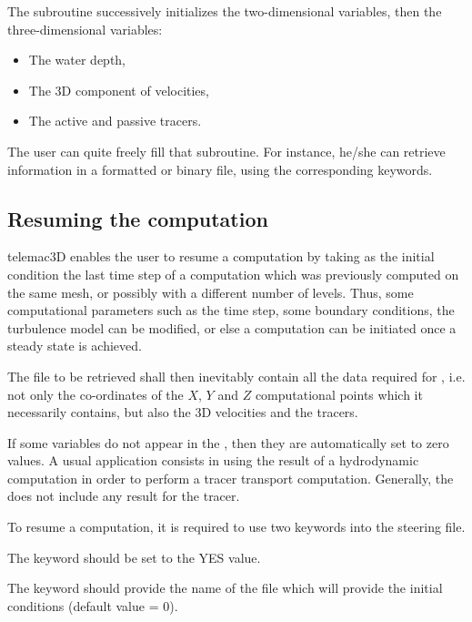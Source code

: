 The  subroutine successively initializes the two-dimensional
variables, then the three-dimensional variables:

\begin{itemize}
\item The water depth,

\item The 3D component of velocities,

\item The active and passive tracers.
\end{itemize}

The user can quite freely fill that subroutine. For instance, he/she can
retrieve information in a formatted or binary file, using the corresponding
keywords.


\subsection{Resuming the computation}

telemac{3D} enables the user to resume a computation by taking as the initial
condition the last time step of a computation which was previously computed on
the same mesh, or possibly with a different number of levels. Thus, some
computational parameters such as the time step, some boundary conditions, the
turbulence model can be modified, or else a computation can be initiated once a
steady state is achieved.

The file to be retrieved shall then inevitably contain all the data required
for , i.e. not only the co-ordinates of the $X$, $Y$
and $Z$ computational points which it necessarily contains, but also the
3D velocities and the tracers.

If some variables do not appear in the , then they are automatically set to zero values.  A usual application
consists in using the result of a hydrodynamic computation in order to perform
a tracer transport computation. Generally, the  does not include any result for the tracer.

To resume a computation, it is required to use two keywords into the steering
file.

The keyword  should be set to the YES value.

The keyword  should provide the name of the
file which will provide the initial conditions (default value = 0).

